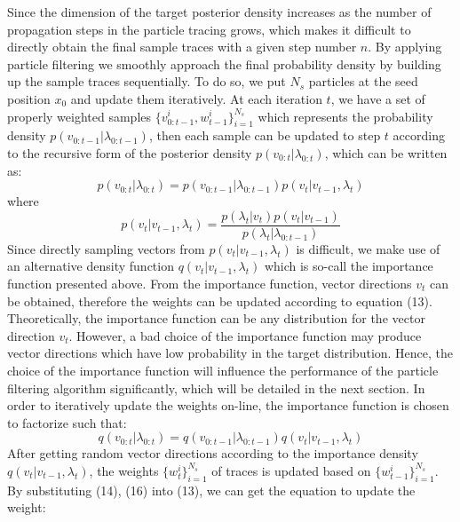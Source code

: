 Since the dimension of the target posterior density increases as the number of propagation steps in the particle tracing grows, which makes it difficult to directly obtain the final sample traces with a given step number $n$. By applying particle filtering we smoothly approach the final probability density by building up the sample traces sequentially. To do so, we put ${N_s}$ particles at the seed position $x_0$ and update them iteratively. At each iteration $t$, we have a set of properly weighted samples $\{ v_{0:t-1}^i,w_{t-1}^i\} _{i = 1}^{{N_s}}$ which represents the probability density $p({v_{0:t-1}}|{\lambda_{0:t-1}})$, then each sample can be updated to step $t$ according to the recursive form of the posterior density $p({v_{0:t}}|{\lambda_{0:t}})$, which can be written as:
\begin{equation}
  p({v_{0:t}}|{\lambda_{0:t}}) = p({v_{0:t - 1}}|{\lambda_{0:t - 1}})p(v_t|v_{t-1},\lambda_t)
\end{equation}
where
\begin{equation}
  p(v_t|v_{t-1},\lambda_t) = \frac{{p({\lambda_t}|{v_t})p({v_t}|{v_{t - 1}})}}{{p({\lambda_t}|{\lambda_{0:t - 1}})}}
\end{equation}
Since directly sampling vectors from $p(v_t|v_{t-1},\lambda_t)$ is difficult, we make use of an alternative density function $q({v_t}|{v_{t - 1}},{\lambda_t})$ which is so-call the importance function presented above. From the importance function, vector directions $v_t$ can be obtained, therefore the weights can be updated according to equation (13). Theoretically, the importance function can be any distribution for the vector direction $v_t$. However, a bad choice of the importance function may produce vector directions which have low probability in the target distribution. Hence, the choice of the importance function will influence the performance of the particle filtering algorithm significantly, which will be detailed in the next section. In order to iteratively update the weights on-line, the importance function is chosen to factorize such that:
\begin{equation}
  q({v_{0:t}}|{\lambda_{0:t}}) = q({v_{0:t - 1}}|{\lambda_{0:t - 1}})q({v_t}|{v_{t - 1}},{\lambda_t})
\end{equation}
After getting random vector directions according to the importance density $q({v_t}|{v_{t - 1}},{\lambda_t})$, the weights $\{w_t^i\} _{i = 1}^{{N_s}}$ of traces is updated based on $\{w_{t-1}^i\} _{i = 1}^{{N_s}}$. By substituting (14), (16) into (13), we can get the equation to update the weight:
